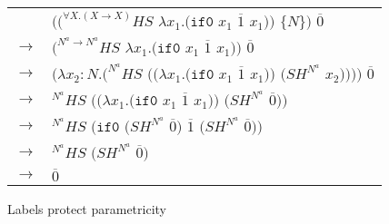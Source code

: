 \begin{figure}[tb]
\centering
\begin{tabular}{ll}
\vspace{5pt}

& $((^{\forall X.(X\rightarrow X)}HS$ $\lambda x_{1}.(\mathtt{if0}$ $x_{1}$ $\overline{1}$ $x_{1}))$ $\lbrace N\rbrace)$ $\overline{0}$ \\

\vspace{5pt}

$\rightarrow$ & $(^{N^{a}\rightarrow N^{a}}HS$ $\lambda x_{1}.(\mathtt{if0}$ $x_{1}$ $\overline{1}$ $x_{1}))$ $\overline{0}$ \\

\vspace{5pt}

$\rightarrow$ & $(\lambda x_{2}:N.(^{N^{a}}HS$ $((\lambda x_{1}.(\mathtt{if0}$ $x_{1}$ $\overline{1}$ $x_{1}))$ $(SH^{N^{a}}$ $x_{2}))))$ $\overline{0}$ \\

\vspace{5pt}

$\rightarrow$ & $^{N^{a}}HS$ $((\lambda x_{1}.(\mathtt{if0}$ $x_{1}$ $\overline{1}$ $x_{1}))$ $(SH^{N^{a}}$ $\overline{0}))$ \\

\vspace{5pt}

$\rightarrow$ & $^{N^{a}}HS$ $(\mathtt{if0}$ $(SH^{N^{a}}$ $\overline{0})$ $\overline{1}$ $(SH^{N^{a}}$ $\overline{0}))$ \\

\vspace{5pt}

$\rightarrow$ & ${^{N^{a}}H}S$ $(SH^{N^{a}}$ $\overline{0})$ \\

\vspace{5pt}

$\rightarrow$ & $\overline{0}$
\end{tabular}
\caption{Labels protect parametricity}
\label{forall-1}
\end{figure}